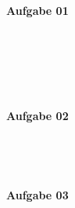 \documentclass[a4paper,10pt]{article}
\begin{document}
	\parindent0pt
	\textbf{Aufgabe 01}
	\begin{compactenum} [(a)]
		\item \begin{compactenum} [(i)]
			\item
			\item
		\end{compactenum} \
		\item \begin{compactenum} [(i)]
		\item
		\item
		\end{compactenum} \
	\end{compactenum} \

	\textbf{Aufgabe 02}
	\begin{compactenum} [(a)]
		\item \begin{compactenum} [(i)]
			\item
			\item
			\item
		\end{compactenum} \
		\item \begin{compactenum} [(i)]
			\item
			\item
			\item
			\item
		\end{compactenum}
	\end{compactenum} \

	\textbf{Aufgabe 03}
	\begin{compactenum} [(a)]
		\item
		\item
	\end{compactenum} \
\end{document}
